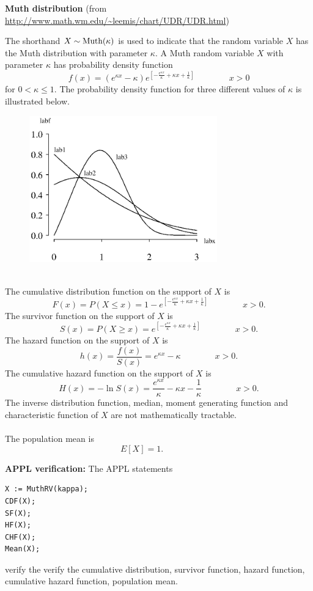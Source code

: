 \documentclass[12pt,fullpage]{article}
\begin{document}
\noindent
{\bf Muth distribution} (from \color{blue}\url{http://www.math.wm.edu/~leemis/chart/UDR/UDR.html}\color{black})

\noindent
The shorthand $X \sim {\rm Muth}(\kappa)$ is used to indicate that the
random variable $X$ has the Muth distribution with parameter $\kappa$.
A Muth random variable $X$ with parameter $\kappa$ has probability density function 
$$
f(x) = (e ^ {\kappa x} - \kappa) e ^ {[-\frac{e ^ {\kappa x}}{\kappa} +\kappa x +\frac{1}{\kappa}]} \qquad \qquad x > 0
$$
for $0<\kappa \leq 1.$
The probability density function for three different values of $\kappa$ is illustrated below.
{\begin{figure}[h!]
\begin{center}
\includegraphics[width=3.2in]{MuthPlot.ps}
\end{center}
\end{figure}}\\
The cumulative distribution function on
the support of $X$ is
$$
F(x) = P(X \le x) = 1 - e ^ {\left[-\frac{e ^ {\kappa x}}{\kappa} + \kappa x + \frac{1}{\kappa} \right]} \qquad \qquad x > 0.
$$
The survivor function on the support of $X$ is
$$
S(x) = P(X \ge x) = e ^ {\left[-\frac{e ^ {\kappa x}}{\kappa} +\kappa x + \frac{1}{\kappa} \right]} \qquad \qquad x > 0.
$$
The hazard function on the support of $X$ is
$$
h(x) = \frac{f(x)}{S(x)} = e ^ {\kappa x} -\kappa \qquad \qquad x > 0.
$$
The cumulative hazard function on the support of $X$ is
$$
H(x) = - \ln S(x) = \frac{e ^ {\kappa x}}{\kappa} -\kappa x - \frac{1}{\kappa} \qquad \qquad x > 0.
$$
The inverse distribution function, median, moment generating function and characteristic function of $X$ are not mathematically tractable.\\
\\
The population mean is
$$
E[X] = 1. \qquad \qquad 
$$

\vspace{0.1in}

\newpage
\noindent
{\bf APPL verification:}
The APPL statements
\begin{verbatim}
X := MuthRV(kappa);
CDF(X);
SF(X);
HF(X);
CHF(X);
Mean(X);
\end{verbatim}
verify the verify the cumulative distribution, survivor function, hazard function, cumulative hazard function, population mean.
\end{document}
